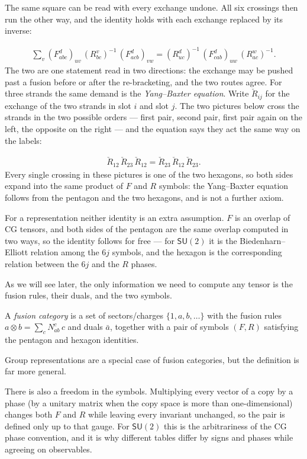 The same square can be read with every exchange undone. All six crossings then run the other way, and the identity holds with each exchange replaced by its inverse:

\begin{align}
    \sum_{v} (F^{d}_{abc})_{uv}\,(R_{bc}^v)^{-1}\,(F^{d}_{acb})_{vw} = (R_{uc}^d)^{-1}\,(F^{d}_{cab})_{uw}\,(R_{ac}^w)^{-1}.
\end{align}
The two are one statement read in two directions: the exchange may be pushed past a fusion before or after the re-bracketing, and the two routes agree. For three strands the same demand is the \emph{Yang--Baxter equation}. Write $\check R_{ij}$ for the exchange of the two strands in slot $i$ and slot $j$. The two pictures below cross the strands in the two possible orders --- first pair, second pair, first pair again on the left, the opposite on the right --- and the equation says they act the same way on the labels:

\begin{align}
    \check R_{12}\,\check R_{23}\,\check R_{12} = \check R_{23}\,\check R_{12}\,\check R_{23}.
\end{align}
Every single crossing in these pictures is one of the two hexagons, so both sides expand into the same product of $F$ and $R$ symbols: the Yang--Baxter equation follows from the pentagon and the two hexagons, and is not a further axiom.

For a representation neither identity is an extra assumption. $F$ is an overlap of CG tensors, and both sides of the pentagon are the same overlap computed in two ways, so the identity follows for free --- for $\mathsf{SU}(2)$ it is the Biedenharn--Elliott relation among the $6j$ symbols, and the hexagon is the corresponding relation between the $6j$ and the $R$ phases. 

As we will see later, the only information we need to compute any tensor is the fusion rules, their duals, and the two symbols. \begin{definition}
    A \emph{fusion category} is a set of sectors/charges $\{1,a,b,\dots\}$ with the fusion rules $a\otimes b=\sum_c N_{ab}^c\,c$ and duals $\bar{a}$, together with a pair of symbols $(F,R)$ satisfying the pentagon and hexagon identities.
\end{definition}
Group representations are a special case of fusion categories, but the definition is far more general. 

There is also a freedom in the symbols. Multiplying every vector of a copy by a phase (by a unitary matrix when the copy space is more than one-dimensional) changes both $F$ and $R$ while leaving every invariant unchanged, so the pair is defined only up to that gauge. For $\mathsf{SU}(2)$ this is the arbitrariness of the CG phase convention, and it is why different tables differ by signs and phases while agreeing on observables.
